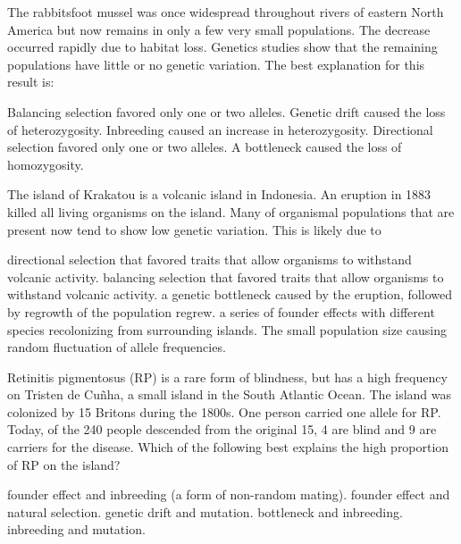 \question
The rabbitsfoot mussel was once widespread throughout rivers of eastern North America but now remains in only a few very small populations. The decrease occurred rapidly due to habitat loss. Genetics studies show that the remaining populations have little or no genetic variation. The best explanation for this result is:

\begin{choices}
\choice Balancing selection favored only one or two alleles. %
\correctchoice Genetic drift caused the loss of heterozygosity. %
\choice Inbreeding caused an increase in heterozygosity. %
\choice Directional selection favored only one or two alleles. %
\choice A bottleneck caused the loss of homozygosity. %
\end{choices}

\question
The island of Krakatou is a volcanic island in Indonesia.  An eruption in 1883 killed all living organisms on the island.  Many of organismal populations that are present now tend to show low genetic variation.  This is likely due to

\begin{choices}
\choice directional selection that favored traits that allow organisms to withstand volcanic activity. %
\choice balancing selection that favored traits that allow organisms to withstand volcanic activity. %
\choice a genetic bottleneck caused by the eruption, followed by regrowth of the population regrew. %
\correctchoice a series of founder effects with different species recolonizing from surrounding islands. %
\choice The small population size causing random fluctuation of allele frequencies. %
\end{choices}


\question
Retinitis pigmentosus (RP) is a rare form of blindness, but has a high frequency on Tristen de Cu\~nha, a small island in the South Atlantic Ocean.  The island was colonized by 15 Britons during the 1800s.  One person carried one allele for RP.  Today, of the 240 people descended from the original 15, 4 are blind and 9 are carriers for the disease.  Which of the following best explains the high proportion of RP on the island?

\begin{choices}
\correctchoice founder effect and inbreeding (a form of non-random mating).%
\choice founder effect and natural selection.%
\choice genetic drift and mutation.%
\choice bottleneck and inbreeding.%
\choice inbreeding and mutation.%
\end{choices}


